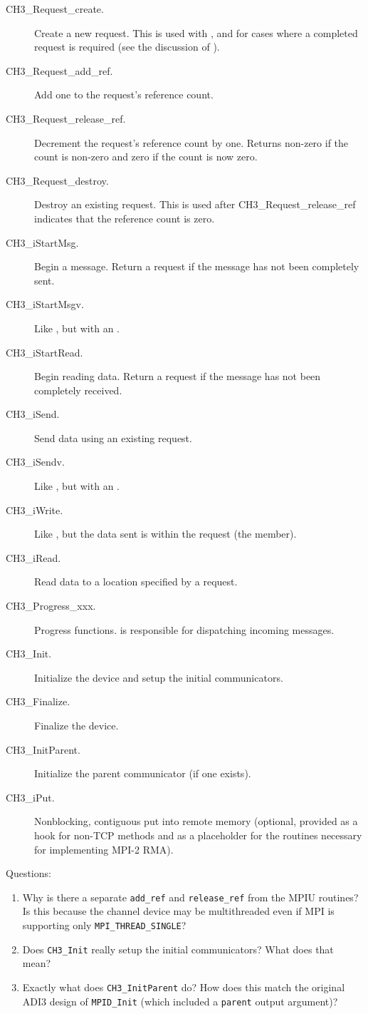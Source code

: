 \documentclass{article}
\def\mpids#1#2{\code{#2}\index{#1!#2}}
\begin{document}
\begin{description}
\item[CH3\_Request\_create.]Create a new request. This is used with
  , and for cases where a completed request is required (see
  the discussion of ).
\item[CH3\_Request\_add\_ref.] Add one to the request's reference count.
\item[CH3\_Request\_release\_ref.]Decrement the request's reference count
   by one.  Returns non-zero if the count is non-zero and zero if the count
   is now zero.
\item[CH3\_Request\_destroy.]Destroy an existing request. This is used
after CH3\_Request\_release\_ref indicates that the reference count is
zero.
\item[CH3\_iStartMsg.]Begin a message.  Return a request if the message has not
  been completely sent.
\item[CH3\_iStartMsgv.]Like , but with an .
\item[CH3\_iStartRead.]Begin reading data.  Return a request if the message has
  not been completely received.
\item[CH3\_iSend.]Send data using an existing request.
\item[CH3\_iSendv.]Like , but with an .
\item[CH3\_iWrite.]Like , but the data sent is within the
  request (the \mpids{MPID_Request}{active\_buf} member).
\item[CH3\_iRead.]Read data to a location specified by a request.
\item[CH3\_Progress\_xxx.]Progress functions.   is
  responsible for dispatching incoming messages.
\item[CH3\_Init.]Initialize the device and setup the initial communicators.
\item[CH3\_Finalize.]Finalize the device.
\item[CH3\_InitParent.]Initialize the parent communicator (if one exists).
\item[CH3\_iPut.]Nonblocking, contiguous put into remote memory (optional,
  provided as a hook for non-TCP methods and as a placeholder for the
  routines necessary for implementing MPI-2 RMA).
\end{description}

Questions:
\begin{enumerate}
\item Why is there a separate \texttt{add\_ref} and
  \texttt{release\_ref} from the MPIU routines?  Is this because the
  channel device may be multithreaded even if MPI is supporting only
  \texttt{MPI\_THREAD\_SINGLE}?  
\item Does \texttt{CH3\_Init} really setup the initial communicators?
  What does that mean?
\item Exactly what does \texttt{CH3\_InitParent} do?  How does this
  match the original ADI3 design of \texttt{MPID\_Init} (which
  included a \texttt{parent} output argument)?
\end{enumerate}
\end{document}
